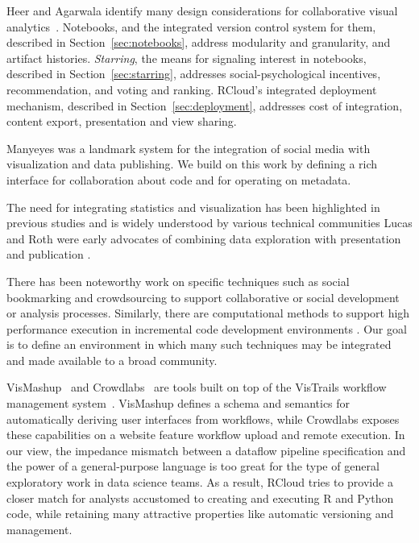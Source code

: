Heer and Agarwala identify many design considerations for
collaborative visual analytics~\cite{Heer:2008:DCF}.
Notebooks, and the integrated version control system for them, described in
Section~\ref{sec:notebooks}, address modularity and granularity, and
artifact histories.
\emph{Starring}, the means for signaling interest in notebooks, described in
Section~\ref{sec:starring}, addresses social-psychological incentives,
recommendation, and voting and ranking. RCloud's integrated deployment
mechanism, described in Section~\ref{sec:deployment}, addresses cost of
integration, content export, presentation and view sharing.

Manyeyes \cite{Viegas:2007:MAS} was a landmark system for the integration
of social media with visualization and data publishing. We build on this
work by defining a rich interface for collaboration about code and for
operating on metadata.

The need for integrating statistics and visualization has been
highlighted in previous studies and is widely understood by
various technical communities \cite{Perer:2008:ISA}
Lucas and Roth were early advocates of combining
data exploration with presentation and publication \cite{Lucas:1996:EIV}.

There has been noteworthy work on specific techniques such as
social bookmarking \cite{Millen:2006:DSB} \cite{Heer:2007:VAV}
and crowdsourcing \cite{Fast:2014:ECS} to support collaborative
or social development or analysis processes.
Similarly, there are computational methods to support high
performance execution in incremental code development
environments \cite{Guo:2010:TPI}.
Our goal is to define an environment in which many such
techniques may be integrated and made available to a broad community.

VisMashup~\cite{Santos:2009:VST} and Crowdlabs~\cite{Mates:2011:CSA}
are tools built on top of the VisTrails workflow management
system~\cite{Callahan:2006:VVM}. VisMashup defines a schema and
semantics for automatically deriving user interfaces from workflows,
while Crowdlabs exposes these capabilities on a website feature
workflow upload and remote execution. In our view, the impedance
mismatch between a dataflow pipeline specification and the power of a
general-purpose language is too great for the type of general
exploratory work in data science teams. As a result, RCloud tries to
provide a closer match for analysts accustomed to creating and
executing R and Python code, while retaining many attractive
properties like automatic versioning and management.

